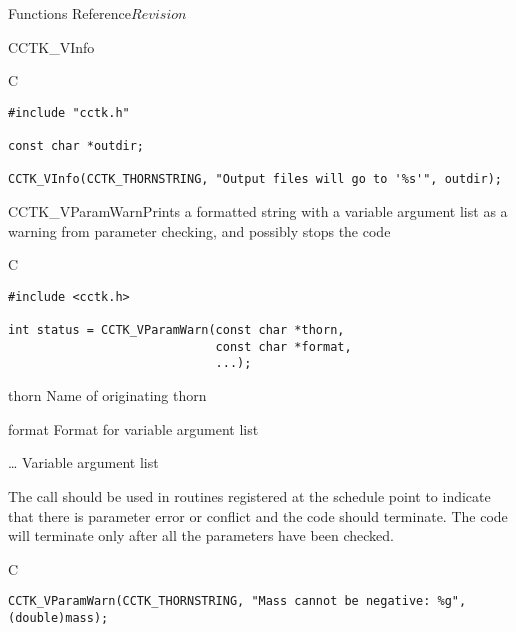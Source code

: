 \begin{cactuspart}{ Functions Reference}{}{$Revision$}
\begin{FunctionDescription}{CCTK\_VInfo}
\begin{ExampleSection}
\begin{Example}{C}
\begin{verbatim}
#include "cctk.h"

const char *outdir;

CCTK_VInfo(CCTK_THORNSTRING, "Output files will go to '%s'", outdir);
\end{verbatim}
\end{Example}
\end{ExampleSection}
\end{FunctionDescription}


\begin{FunctionDescription}{CCTK\_VParamWarn}{Prints a formatted string with a variable argument list as a warning from parameter checking, and possibly stops the code}
\label{CCTK-VParamWarn}
\begin{SynopsisSection}
\begin{Synopsis}{C}
\begin{verbatim}
#include <cctk.h>

int status = CCTK_VParamWarn(const char *thorn,
                             const char *format,
                             ...);
\end{verbatim}
\end{Synopsis}
\end{SynopsisSection}
\begin{ParameterSection}
\begin{Parameter}{thorn}
Name of originating thorn
\end{Parameter}
\begin{Parameter}{format}
Format for variable argument list
\end{Parameter}
\begin{Parameter}{\ldots}
Variable argument list
\end{Parameter}
\end{ParameterSection}
\begin{Discussion}
The call should be used in routines registered at the schedule point 
to indicate that there is parameter error or conflict and the code should
terminate. The code will terminate only after all the parameters have been
checked.
\end{Discussion}
\begin{ExampleSection}
\begin{Example}{C}
\begin{verbatim}
CCTK_VParamWarn(CCTK_THORNSTRING, "Mass cannot be negative: %g", (double)mass);
\end{verbatim}
\end{Example}
\end{ExampleSection}


\end{FunctionDescription}
\end{cactuspart}
